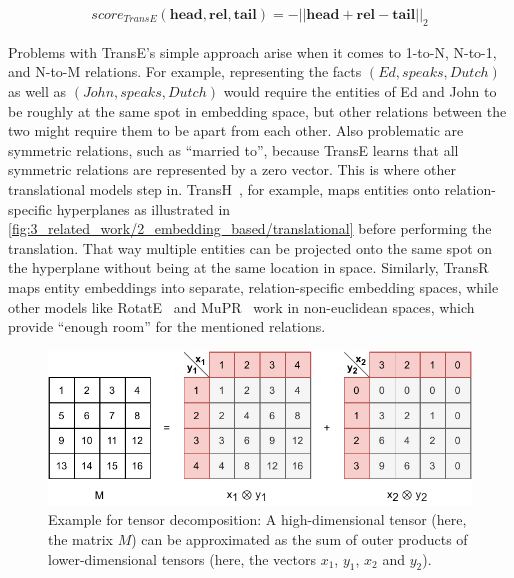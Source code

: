 \begin{align}
    score_{TransE}(\textbf{head}, \textbf{rel}, \textbf{tail}) = {- || \textbf{head} + \textbf{rel} - \textbf{tail} ||}_{2}
    \label{eq:3_related_work/2_embedding_based/trans_e}
\end{align}

Problems with TransE's simple approach arise when it comes to 1-to-N, N-to-1, and N-to-M relations. For example, representing the facts $(Ed, speaks, Dutch)$ as well as $(John, speaks, Dutch)$ would require the entities of Ed and John to be roughly at the same spot in embedding space, but other relations between the two might require them to be apart from each other. Also problematic are symmetric relations, such as ``married to'', because TransE learns that all symmetric relations are represented by a zero vector. This is where other translational models step in. TransH~\cite{Wang2014KnowledgeGE}, for example, maps entities onto relation-specific hyperplanes as illustrated in \autoref{fig:3_related_work/2_embedding_based/translational} before performing the translation. That way multiple entities can be projected onto the same spot on the hyperplane without being at the same location in space. Similarly, TransR~\cite{Lin2015LearningEA} maps entity embeddings into separate, relation-specific embedding spaces, while other models like RotatE~\cite{Sun2019RotatEKG} and MuPR~\cite{Balazevic2019MultirelationalPG} work in non-euclidean spaces, which provide ``enough room'' for the mentioned relations.

\begin{figure}[t]
    \centering
    \includegraphics{3_related_work/2_embedding_based/tensor_decomposition}
    \caption{Example for tensor decomposition: A high-dimensional tensor (here, the matrix $M$) can be approximated as the sum of outer products of lower-dimensional tensors (here, the vectors $x_1$, $y_1$, $x_2$ and $y_2$).}
    \label{fig:3_related_work/2_embedding_based/tensor_decomposition}
\end{figure}

